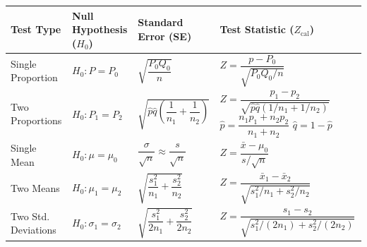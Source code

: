 \documentclass[12pt,a4paper]{article}
\renewcommand{\arraystretch}{1.45}
\begin{document}
\begin{tcolorbox}[tikzbox, title={\textbf{Summary Matrix: Comprehensive Decision Table of Large Sample Significance Tests}}]
\par\vspace{1pt}
\begingroup
\setlength{\tabcolsep}{3.5pt}
\setlength{\extrarowheight}{1.5pt}
\renewcommand{\arraystretch}{1.22}
\noindent\begin{tabularx}{\linewidth}{|B{2.2cm}|B{2.2cm}|B{3.0cm}|Y|}
\hline
\textbf{Test Type} & \textbf{Null Hypothesis ($H_0$)} & \textbf{Standard Error (SE)} & \textbf{Test Statistic ($Z_{\text{cal}}$)} \\
\hline
Single Proportion & $H_0: P = P_0$ & $\sqrt{\dfrac{P_0 Q_0}{n}}$ & $Z = \dfrac{p - P_0}{\sqrt{P_0 Q_0 / n}}$ \\
\hline
Two Proportions & $H_0: P_1 = P_2$ & $\sqrt{\hat{p}\hat{q}\left(\dfrac{1}{n_1} + \dfrac{1}{n_2}\right)}$ & $Z = \dfrac{p_1 - p_2}{\sqrt{\hat{p}\hat{q}(1/n_1 + 1/n_2)}}$  \\
\hline
Single Mean & $H_0: \mu = \mu_0$ & $\dfrac{\sigma}{\sqrt{n}} \approx \dfrac{s}{\sqrt{n}}$ & $Z = \dfrac{\bar{x} - \mu_0}{s / \sqrt{n}}$ \\
\hline
Two Means & $H_0: \mu_1 = \mu_2$ & $\sqrt{\dfrac{s_1^2}{n_1} + \dfrac{s_2^2}{n_2}}$ & $Z = \dfrac{\bar{x}_1 - \bar{x}_2}{\sqrt{s_1^2/n_1 + s_2^2/n_2}}$ \\
\hline
Two Std. Deviations & $H_0: \sigma_1 = \sigma_2$ & $\sqrt{\dfrac{s_1^2}{2n_1} + \dfrac{s_2^2}{2n_2}}$ & $Z = \dfrac{s_1 - s_2}{\sqrt{s_1^2/(2n_1) + s_2^2/(2n_2)}}$ \\
\hline
\end{tabularx}\par
\endgroup
\end{tcolorbox}
\end{document}
